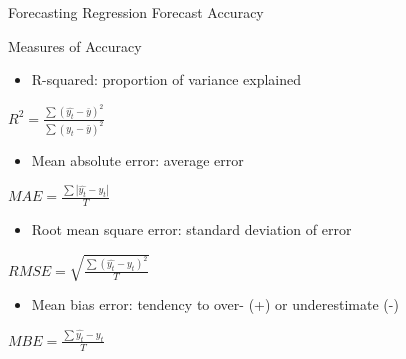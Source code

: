 \documentclass[
  ignorenonframetext,
]{beamer}
\providecommand{\tightlist}{%
  \setlength{\itemsep}{0pt}\setlength{\parskip}{0pt}}
\begin{document}
\begin{frame}{Forecasting \textbar{} \small Regression Forecast
Accuracy}
\protect\hypertarget{forecasting-regression-forecast-accuracy}{}
\begin{block}{Measures of Accuracy}
\protect\hypertarget{measures-of-accuracy}{}
\begin{itemize}
\tightlist
\item
  R-squared: proportion of variance explained \newline
\end{itemize}

\center \(R^2 = \frac{\sum(\hat{y_t} - \bar{y})^2}{\sum(y_t - \bar{y})^2}\)
\newline

\begin{itemize}
\tightlist
\item
  Mean absolute error: average error \newline
\end{itemize}

\center \(MAE = \frac{\sum |\hat{y_t} - y_t|}{T}\) \newline

\begin{itemize}
\tightlist
\item
  Root mean square error: standard deviation of error \newline
\end{itemize}

\center \(RMSE = \sqrt{\frac{\sum (\hat{y_t} - y_t)^2}{T}}\) \newline

\begin{itemize}
\tightlist
\item
  Mean bias error: tendency to over- (+) or underestimate (-) \newline
\end{itemize}

\center \(MBE = \frac{\sum \hat{y_t} - y_t}{T}\)
\end{block}
\end{frame}
\end{document}

